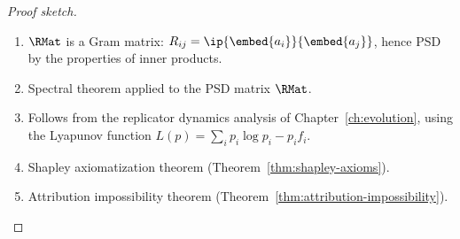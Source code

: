 \begin{proof}[Proof sketch]
\begin{enumerate}
\item $\RMat$ is a Gram matrix: $R_{ij} = \ip{\embed{a_i}}{\embed{a_j}}$,
  hence PSD by the properties of inner products.
\item Spectral theorem applied to the PSD matrix $\RMat$.
\item Follows from the replicator dynamics analysis of
  Chapter~\ref{ch:evolution}, using the Lyapunov function
  $L(p) = \sum_i p_i \log p_i - p_i f_i$.
\item Shapley axiomatization theorem (Theorem~\ref{thm:shapley-axioms}).
\item Attribution impossibility theorem
  (Theorem~\ref{thm:attribution-impossibility}).
\end{enumerate}
\end{proof}

